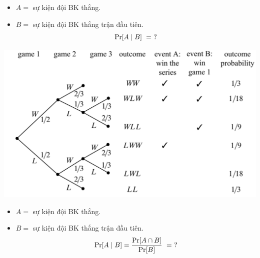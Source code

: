 \begin{frame}
  \begin{itemize}
  \item $A = $ sự kiện đội BK thắng.
  \item $B = $ sự kiện đội BK thắng trận đầu tiên.
    $$
    \mathrm{Pr}[A \mid B] \ = \ ?
    $$
  \end{itemize}
\end{frame}
\begin{frame}
  \begin{block}{}
    \begin{center}
      \includegraphics[width=\textwidth]{fig1713.pdf}
    \end{center}
  \end{block}
\end{frame}


  

\begin{frame}
  \begin{itemize}
  \item $A = $ sự kiện đội BK thắng.
  \item $B = $ sự kiện đội BK thắng trận đầu tiên.
    $$  
    \mathrm{Pr}[A \mid B] = \frac{\mathrm{Pr}[A \cap B]}{\mathrm{Pr}[B]}\ =\ ?
    $$
    
  \end{itemize}
\end{frame}

